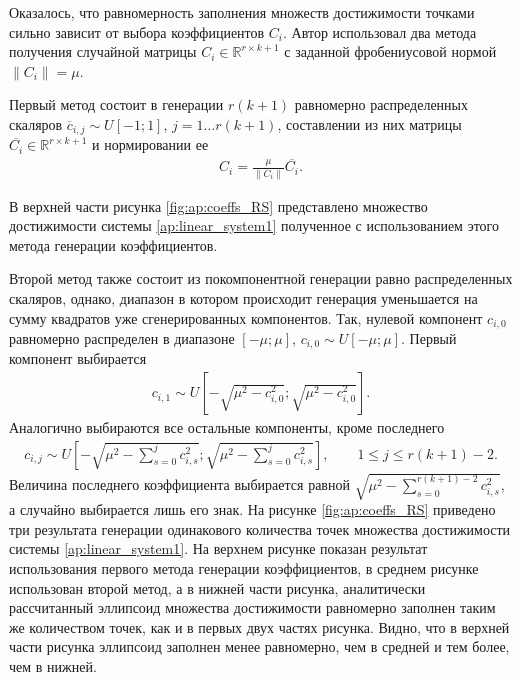\documentclass[../main.tex]{subfiles}
\begin{document}
  Оказалось, что равномерность заполнения множеств достижимости точками сильно зависит от выбора коэффициентов $C_i$. 
  Автор использовал два метода получения случайной матрицы $C_i \in \mathbb{R}^{r \times k+1}$  с заданной фробениусовой нормой $ \|C_i\| = \mu$. 
  
  Первый метод состоит в генерации $r (k + 1)$ равномерно распределенных скаляров $\overline{c}_{i, j} \sim U[-1;1]$, $ j = 1\dots r (k + 1)$, составлении из них матрицы $\overline{C_i}  \in \mathbb{R}^{r \times k+1}$ и нормировании ее
  \begin{gather*}
  		C_i = \frac{\mu}{\|C_i\|}\overline{C_i}.
  \end{gather*}
  
  В верхней части рисунка \ref{fig:ap:coeffs_RS} представлено множество достижимости системы \eqref{ap:linear_system1} полученное с использованием этого метода генерации коэффициентов. 
 
  Второй метод также состоит из покомпонентной генерации равно распределенных скаляров, однако, диапазон в котором происходит генерация уменьшается на сумму квадратов уже сгенерированных компонентов.   
  Так, нулевой компонент $c_{i, 0}$ равномерно распределен в диапазоне $[-\mu; \mu]$, $c_{i, 0} \sim U[-\mu; \mu]$. 
  Первый компонент выбирается 
  \begin{gather*}
  	 c_{i, 1} \sim U\left[-\sqrt{\mu^2 - c_{i, 0}^2}; \sqrt{\mu^2 - c_{i, 0}^2}\right].
  \end{gather*} 
  Аналогично выбираются все остальные компоненты, кроме последнего
    \begin{gather*}
  	c_{i, j} \sim U\left[-\sqrt{\mu^2 - \sum\limits_{s = 0}^j c_{i, s}^2}; \sqrt{\mu^2 - \sum\limits_{s = 0}^j c_{i, s}^2}\right], \qquad 1 \leqslant j \leqslant r(k+1) - 2.
  \end{gather*} 
  Величина последнего коэффициента выбирается равной $\sqrt{\mu^2 - \sum\limits_{s = 0}^{r(k+1) - 2} c_{i, s}^2} $, а случайно выбирается лишь его знак.
  На рисунке \ref{fig:ap:coeffs_RS} приведено три результата генерации одинакового количества точек множества достижимости системы \eqref{ap:linear_system1}.
  На верхнем рисунке показан результат использования первого метода генерации коэффициентов, в среднем рисунке использован второй метод, а в нижней части рисунка, аналитически рассчитанный эллипсоид множества достижимости равномерно заполнен таким же количеством точек, как и в первых двух частях рисунка. 
  Видно, что в верхней части рисунка эллипсоид заполнен менее равномерно, чем в средней и тем более, чем в нижней. 
  
\end{document}
